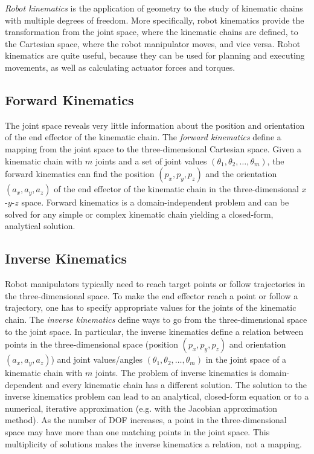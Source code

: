 \textit{Robot kinematics} is the application of geometry to the study of  kinematic chains with multiple degrees of freedom. More specifically, robot kinematics provide the transformation from the joint space, where the kinematic chains are defined, to the Cartesian space, where the robot manipulator moves, and vice versa. Robot kinematics are quite useful, because they can be used for planning and executing movements, as well as calculating actuator forces and torques.



\subsection{Forward Kinematics}
The joint space reveals very little information about the position and orientation of the end effector of the kinematic chain. The \textit{forward kinematics} define a mapping from the joint space to the three-dimensional Cartesian space. Given a kinematic chain with $m$ joints and a set of joint values $(\theta_1, \theta_2,\ldots,\theta_m)$, the forward kinematics can find the position $(p_x,p_y,p_z)$ and the orientation $(a_x,a_y,a_z)$ of the end effector of the kinematic chain in the three-dimensional $x$-$y$-$z$ space. Forward kinematics is a domain-independent problem and can be solved for any simple or complex kinematic chain yielding a closed-form, analytical solution. 

\subsection{Inverse Kinematics}
Robot manipulators typically need to reach target points or follow trajectories in the three-dimensional space. To make the end effector reach a point or follow a trajectory, one has to specify appropriate values for the joints of the kinematic chain. The \textit{inverse kinematics} define ways to go from the three-dimensional space to the joint space. In particular, the inverse kinematics define a relation between points in the three-dimensional space (position $(p_x,p_y,p_z)$ and orientation $(a_x,a_y,a_z)$) and joint values/angles $(\theta_1, \theta_2,\ldots,\theta_m)$ in the joint space of a kinematic chain with $m$ joints. The problem of inverse kinematics is domain-dependent and every kinematic chain has a different solution. The solution to the inverse kinematics problem can lead to an analytical, closed-form equation or to a numerical, iterative approximation (e.g. with the Jacobian approximation method). As the number of DOF increases, a point in the three-dimensional space may have more than one matching points in the joint space. This multiplicity of solutions makes the inverse kinematics a relation, not a mapping.




